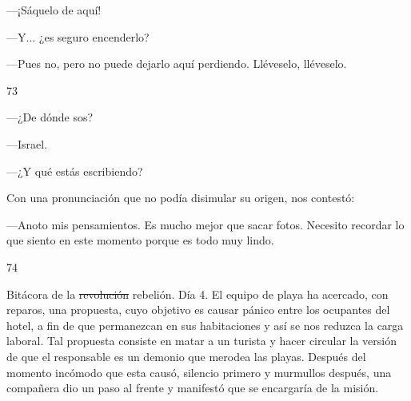 \documentclass[12pt,twoside,openright,a5paper]{book}
\begin{document}
\nopagebreak

---¡Sáquelo de aquí!

---Y... ¿es seguro encenderlo?

---Pues no, pero no puede dejarlo aquí perdiendo. Lléveselo, lléveselo.

\vspace{0.5cm}

\hrulefill \hspace{0.1cm}\decofourleft\hspace{0.2cm} 73 \hspace{0.2cm}\decofourright \hspace{0.1cm}\hrulefill

\nopagebreak

\vspace{0.5cm}

\nopagebreak

---¿De dónde sos?

---Israel.

---¿Y qué estás escribiendo?

Con una pronunciación que no podía disimular su origen, nos contestó:

---Anoto
mis pensamientos. Es mucho mejor que sacar fotos. Necesito recordar lo que
siento en este momento porque es todo muy lindo.

\vspace{0.5cm}

\hrulefill \hspace{0.1cm}\decofourleft\hspace{0.2cm} 74 \hspace{0.2cm}\decofourright \hspace{0.1cm}\hrulefill

\nopagebreak

\vspace{0.5cm}

\nopagebreak

Bitácora de la \st{revolución} rebelión. Día 4. El equipo de playa ha acercado, con
reparos, una propuesta, cuyo objetivo es causar pánico entre
los ocupantes del hotel, a fin de que permanezcan en sus habitaciones y así
se nos reduzca la carga laboral. Tal propuesta consiste en
matar a un turista y hacer circular la versión de que el responsable es un
demonio que merodea las playas.
Después del momento incómodo que esta causó,
silencio primero y murmullos después, una compañera dio
un paso al frente y manifestó que se encargaría de la misión.
\end{document}
